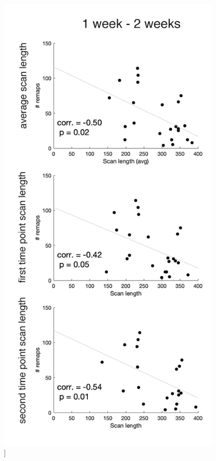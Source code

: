 \documentclass[phd,tocprelim]{cornell}
\renewcommand{\caption}[1]{\singlespacing\hangcaption{#1}\normalspacing}
\begin{document}
\begin{figure}[h!]
    \includegraphics[width=\textwidth]{chapter1/SupplementaryFigure4A.png}
    \caption[]{}
\end{figure}
\end{document}

